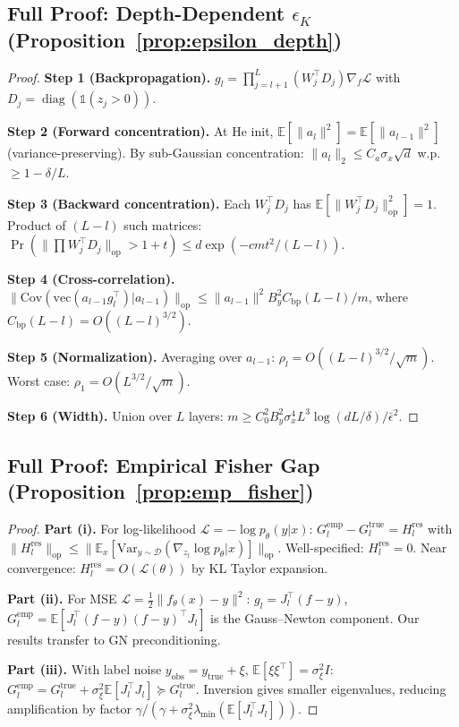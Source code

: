 \documentclass{article}
\providecommand{\E}{\mathbb{E}}
\providecommand{\norm}[1]{\lVert #1 \rVert}
\DeclareMathOperator{\diag}{diag}
\theoremstyle{plain}
\theoremstyle{definition}
\theoremstyle{remark}
\begin{document}
\subsection{Full Proof: Depth-Dependent $\epsilon_K$ (Proposition~\ref{prop:epsilon_depth})}

\begin{proof}
\textbf{Step 1 (Backpropagation).} $g_l = \prod_{j=l+1}^L(W_j^\top D_j)\nabla_f\mathcal{L}$ with $D_j = \diag(\mathbb{1}(z_j>0))$.

\textbf{Step 2 (Forward concentration).} At He init, $\E[\norm{a_l}^2]=\E[\norm{a_{l-1}}^2]$ (variance-preserving). By sub-Gaussian concentration: $\norm{a_l}_2 \leq C_a\sigma_x\sqrt{d}$ w.p.\ $\geq 1-\delta/L$.

\textbf{Step 3 (Backward concentration).} Each $W_j^\top D_j$ has $\E[\norm{W_j^\top D_j}_{\mathrm{op}}^2]=1$. Product of $(L-l)$ such matrices: $\Pr(\norm{\prod W_j^\top D_j}_{\mathrm{op}} > 1+t) \leq d\exp(-cmt^2/(L-l))$.

\textbf{Step 4 (Cross-correlation).} $\norm{\mathrm{Cov}(\mathrm{vec}(a_{l-1}g_l^\top)|a_{l-1})}_{\mathrm{op}} \leq \norm{a_{l-1}}^2 B_y^2 C_{\mathrm{bp}}(L-l)/m$, where $C_{\mathrm{bp}}(L-l)=O((L-l)^{3/2})$.

\textbf{Step 5 (Normalization).} Averaging over $a_{l-1}$: $\rho_l = O((L-l)^{3/2}/\sqrt{m})$. Worst case: $\rho_1 = O(L^{3/2}/\sqrt{m})$.

\textbf{Step 6 (Width).} Union over $L$ layers: $m \geq C_0^2 B_y^2\sigma_x^4 L^3\log(dL/\delta)/\bar{\epsilon}^2$.
\end{proof}

\subsection{Full Proof: Empirical Fisher Gap (Proposition~\ref{prop:emp_fisher})}

\begin{proof}
\textbf{Part (i).} For log-likelihood $\mathcal{L}=-\log p_\theta(y|x)$: $G_l^{\mathrm{emp}} - G_l^{\mathrm{true}} = H_l^{\mathrm{res}}$ with $\norm{H_l^{\mathrm{res}}}_{\mathrm{op}} \leq \norm{\E_x[\mathrm{Var}_{y\sim\mathcal{D}}(\nabla_{z_l}\log p_\theta|x)]}_{\mathrm{op}}$. Well-specified: $H_l^{\mathrm{res}}=0$. Near convergence: $H_l^{\mathrm{res}} = O(\mathcal{L}(\theta))$ by KL Taylor expansion.

\textbf{Part (ii).} For MSE $\mathcal{L}=\frac{1}{2}\norm{f_\theta(x)-y}^2$: $g_l = J_l^\top(f-y)$, $G_l^{\mathrm{emp}} = \E[J_l^\top(f-y)(f-y)^\top J_l]$ is the Gauss--Newton component. Our results transfer to GN preconditioning.

\textbf{Part (iii).} With label noise $y_{\mathrm{obs}}=y_{\mathrm{true}}+\xi$, $\E[\xi\xi^\top]=\sigma_\xi^2 I$: $G_l^{\mathrm{emp}} = G_l^{\mathrm{true}} + \sigma_\xi^2\E[J_l^\top J_l] \succeq G_l^{\mathrm{true}}$. Inversion gives smaller eigenvalues, reducing amplification by factor $\gamma/(\gamma+\sigma_\xi^2\lambda_{\min}(\E[J_l^\top J_l]))$.
\end{proof}
\end{document}
